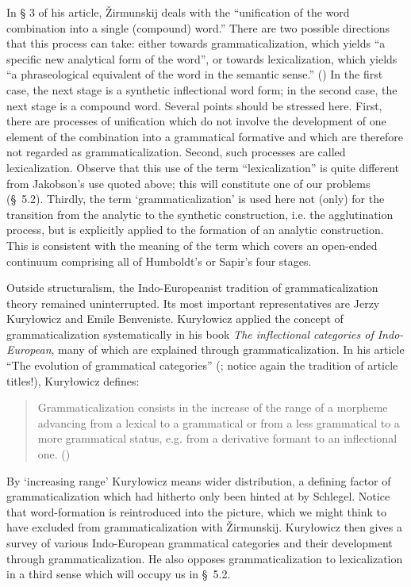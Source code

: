 In § 3 of his article, Žirmunskij deals with the “unification of the word combination into a single (compound) word.” There are two possible directions that this process can take: either towards grammaticalization, which yields “a specific new analytical form of the word”, or towards lexicalization, which yields “a phraseological equivalent of the word in the semantic sense.” (\citeyear[83]{Žirmunskij1966}) In the first case, the next stage is a synthetic inflectional word form; in the second case, the next stage is a compound word. Several points should be stressed here. First, there are processes of unification which do not involve the development of one element of the combination into a grammatical formative and which are therefore not regarded as grammaticalization. Second, such processes are called lexicalization. Observe that this use of the term “lexicalization” is quite different from Jakobson's use quoted above; this will constitute one of our problems (§~5.2). Thirdly, the term ‘grammaticalization’ is used here not (only) for the transition from the analytic to the synthetic construction, i.e. the agglutination process, but is explicitly applied to the formation of an analytic construction. This is consistent with the meaning of the term which covers an open-ended continuum comprising all of Humboldt's or Sapir's four stages.

Outside structuralism, the Indo-Europeanist tradition of grammaticalization theory remained uninterrupted. Its most important representatives are Jerzy Kuryłowicz and Emile Benveniste. Kuryłowicz applied the concept of grammaticalization systematically in his book \textit{The inflectional categories of Indo-European}, many of which are explained through grammaticalization. In his article “The evolution of grammatical categories” (\citeyear{Kuryłowicz1965}; notice again the tradition of article titles!), Kuryłowicz defines:

\begin{quote} \label{quote:kurylowciz}
Grammaticalization consists in the increase of the range of a morpheme advancing from a lexical to a grammatical or from a less grammatical to a more grammatical status, e.g. from a derivative formant to an inflectional one. (\citeyear[52]{Kuryłowicz1965})
\end{quote}

By ‘increasing range’ Kuryłowicz means wider distribution, a defining factor of grammaticalization which had hitherto only been hinted at by Schlegel. Notice that word-formation is reintroduced into the picture, which we might think to have excluded from grammaticalization with Žirmunskij. Kuryłowicz then gives a survey of various Indo-European grammatical categories and their development through grammaticalization. He also opposes grammaticalization to lexicalization in a third sense which will occupy us in §~5.2.

